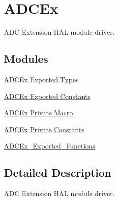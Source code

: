 \hypertarget{group___a_d_c_ex}{}\section{A\+D\+C\+Ex}
\label{group___a_d_c_ex}


A\+DC Extension H\+AL module driver.  


\subsection*{Modules}
\begin{DoxyCompactItemize}
\item 
\hyperlink{group___a_d_c_ex___exported___types}{A\+D\+C\+Ex Exported Types}
\item 
\hyperlink{group___a_d_c_ex___exported___constants}{A\+D\+C\+Ex Exported Constants}
\item 
\hyperlink{group___a_d_c_ex___private___macro}{A\+D\+C\+Ex Private Macro}
\item 
\hyperlink{group___a_d_c_ex___private___constants}{A\+D\+C\+Ex Private Constants}
\item 
\hyperlink{group___a_d_c_ex___exported___functions}{A\+D\+C\+Ex\+\_\+\+Exported\+\_\+\+Functions}
\end{DoxyCompactItemize}


\subsection{Detailed Description}
A\+DC Extension H\+AL module driver. 

